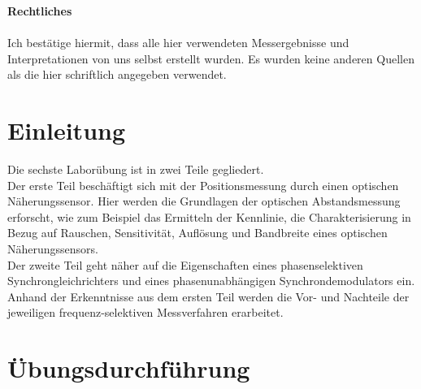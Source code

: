 \documentclass[a4paper,12pt]{article}
\begin{document}
	
	
	\noindent
	\textbf{\Large Rechtliches} \\ \\
	Ich bestätige hiermit, dass alle hier verwendeten Messergebnisse und Interpretationen von uns selbst erstellt wurden. Es wurden keine anderen Quellen als die hier schriftlich angegeben verwendet.
	\setcounter{page}{2}
	
	\newpage
	\tableofcontents
	
	\newpage
	\section{Einleitung}
	Die sechste Laborübung ist in zwei Teile gegliedert.\\ \newline
	Der erste Teil beschäftigt sich mit der Positionsmessung durch einen optischen Näherungssensor. Hier werden die Grundlagen der optischen Abstandsmessung erforscht, wie zum Beispiel das Ermitteln der Kennlinie, die Charakterisierung in Bezug auf Rauschen, Sensitivität, Auflösung und Bandbreite eines optischen Näherungssensors.\\ \newline
	Der zweite Teil geht näher auf die Eigenschaften eines phasenselektiven	Synchrongleichrichters und eines phasenunabhängigen Synchrondemodulators ein. Anhand der Erkenntnisse aus dem ersten Teil werden die Vor- und Nachteile der jeweiligen frequenz-selektiven Messverfahren erarbeitet.\newline
	\newpage
	\section{Übungsdurchführung}
\end{document}
